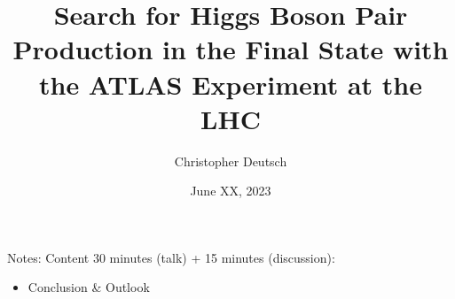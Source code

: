 \documentclass[11pt, xcolor={dvipsnames}, aspectratio=169]{beamer}
\author{Christopher Deutsch}
\institute{University of Bonn}
\date{June XX, 2023}
\title{\vspace{1.5em}Search for Higgs Boson Pair Production in the \bbtautau
  Final State with the ATLAS Experiment at the LHC}
\begin{document}
\maketitle

\begin{frame}[noframenumbering]{Notes: Content}
  30 minutes (talk) + 15 minutes (discussion):
  \begin{itemize}
  \item Conclusion \& Outlook
  \end{itemize}
\end{frame}







\end{document}
